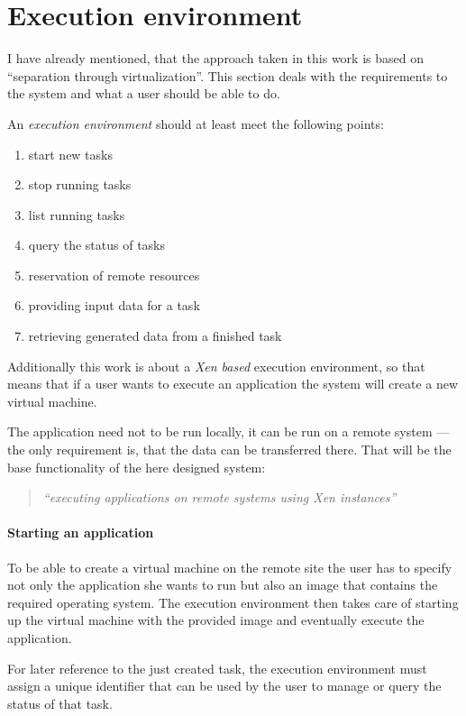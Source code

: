 \section{Execution environment}

I have already mentioned, that the approach taken in this work is based on
``separation  through  virtualization''.   This  section  deals  with  the
requirements to  the system  and what a  user should  be able to  do.

An \emph{execution environment} should at least meet the following points:
\begin{enumerate}
\item start new tasks
\item stop running tasks
\item list running tasks
\item query the status of tasks
\item reservation of remote resources
\item providing input data for a task
\item retrieving generated data from a finished task
\end{enumerate}

Additionally this work is  about a \emph{Xen based} execution environment,
so that  means that if a user  wants to execute an  application the system
will create a new virtual machine.

The application  need not to  be run  locally, it can  be run on  a remote
system  --- the  only requirement  is, that  the data  can  be transferred
there.  That will be the base functionality of the here designed system:

\begin{quote}
  \emph{``executing applications on remote systems using Xen instances''}
\end{quote}

\paragraph{Starting an application}

To be able to create a virtual  machine on the remote site the user has to
specify not only  the application she wants to run but  also an image that
contains the  required operating  system.  The execution  environment then
takes care of starting up the  virtual machine with the provided image and
eventually execute the application.

For later  reference to the  just created task, the  execution environment
must assign a unique identifier that can  be used by the user to manage or
query the status of that task.

